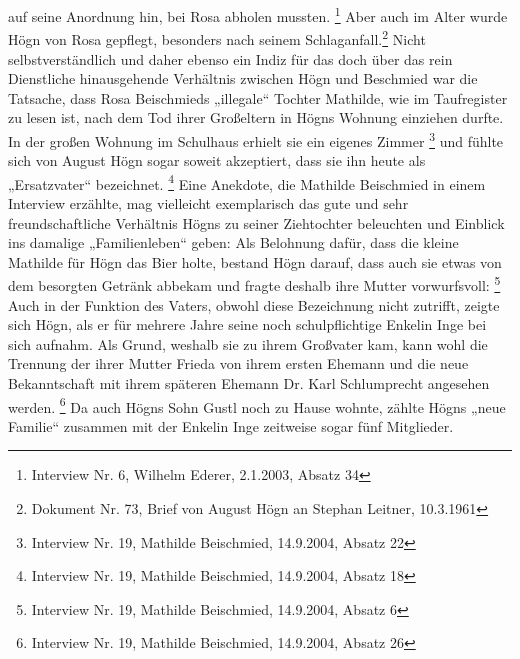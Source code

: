 auf seine Anordnung hin, bei Rosa abholen mussten. \footnote{Interview
Nr. 6, Wilhelm Ederer, 2.1.2003, Absatz 34} Aber auch im Alter wurde
Högn von Rosa gepflegt, besonders nach seinem Schlaganfall.\footnote{
Dokument Nr. 73, Brief von August Högn an Stephan Leitner, 10.3.1961}
Nicht selbstverständlich und daher ebenso ein Indiz für das doch über
das rein Dienstliche hinausgehende Verhältnis zwischen Högn und
Beschmied war die Tatsache, dass Rosa Beischmieds „illegale“ Tochter
Mathilde, wie im Taufregister zu lesen ist, nach dem Tod ihrer
Großeltern in Högns Wohnung einziehen durfte. In der großen Wohnung im
Schulhaus erhielt sie ein eigenes Zimmer \footnote{Interview Nr. 19,
Mathilde Beischmied, 14.9.2004, Absatz 22} und fühlte sich von August
Högn sogar soweit akzeptiert, dass sie ihn heute als „Ersatzvater“
bezeichnet. \footnote{Interview Nr. 19, Mathilde Beischmied, 14.9.2004,
Absatz 18} Eine Anekdote, die Mathilde Beischmied in einem Interview
erzählte, mag vielleicht exemplarisch das gute und sehr
freundschaftliche Verhältnis Högns zu seiner Ziehtochter beleuchten und
Einblick ins damalige „Familienleben“ geben: Als Belohnung dafür, dass
die kleine Mathilde für Högn das Bier holte, bestand Högn darauf, dass
auch sie etwas von dem besorgten Getränk abbekam und fragte deshalb
ihre Mutter vorwurfsvoll:  \footnote{Interview Nr. 19, Mathilde Beischmied, 14.9.2004,
Absatz 6} Auch in der Funktion des Vaters, obwohl diese Bezeichnung
nicht zutrifft, zeigte sich Högn, als er für mehrere Jahre seine noch
schulpflichtige Enkelin Inge bei sich aufnahm. Als Grund, weshalb sie
zu ihrem Großvater kam, kann wohl die Trennung der ihrer Mutter Frieda
von ihrem ersten Ehemann und die neue Bekanntschaft mit ihrem späteren
Ehemann Dr. Karl Schlumprecht angesehen werden. \footnote{Interview Nr.
19, Mathilde Beischmied, 14.9.2004, Absatz 26} Da auch Högns Sohn Gustl
noch zu Hause wohnte, zählte Högns „neue Familie“ zusammen mit der
Enkelin Inge zeitweise sogar fünf Mitglieder.
